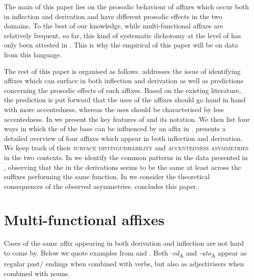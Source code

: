 \documentclass[output=paper, colorlinks, citecolor=brown, newtxmath]{langsci/langscibook}
\begin{document}
The main  of this paper lies on the prosodic behaviour of affixes which occur both in inflection and derivation and have different prosodic effects in the two domains. To the best of our knowledge, while multi-functional affixes are relatively frequent, so far, this kind of systematic dichotomy at the level of  has only been attested in . This is why the empirical  of this paper will be on data from this language.\largerpage[1]

The rest of this paper is organised as follows.  addresses the issue of identifying affixes which can surface in both inflection and derivation as well as predictions concerning the prosodic effects of such affixes. Based on the existing literature, the prediction is put forward that the  uses of the affixes should go hand in hand with more accentedness, whereas the  uses should be characterised by less accentedness. In  we present the key features of   and its notation. We then list four ways in which the  of the base can be influenced by an affix in .  presents a detailed overview of four  affixes which appear in both inflection and derivation. We keep track of their \textsc{surface distinguishability} and  \textsc{accentedness asymmetries} in the two contexts. In  we identify the common patterns in the data presented in , observing that the  in the derivations seems to be the same at least across the suffixes performing the same function. In  we consider the theoretical consequences of the observed asymmetries.  concludes this paper.

\section{Multi-functional affixes}\label{sec:simonovic:2}

Cases of the same affix appearing in both derivation and inflection are not hard to come by. Below we quote examples from  and . Both  \textit{-ed}\textsubscript{A} and  \textit{-uto}\textsubscript{A} appear as regular past/ endings when combined with verbs, but also as adjectivisers when combined with nouns.
\end{document}
